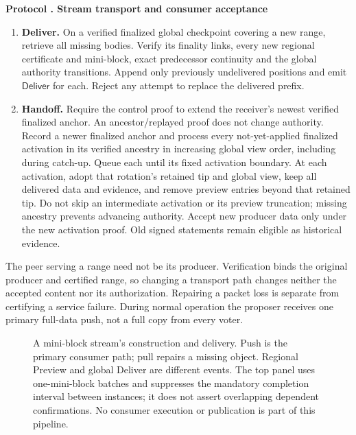 \documentclass[11pt,a4paper,onecolumn]{article}
\newcommand{\RC}{\mathsf{RC}}
\newcommand{\Tag}[1]{\mathsf{#1}}
\newcommand{\Proc}[1]{\textnormal{\textsc{#1}}}
\theoremstyle{remark}\newtheorem{example}[definition]{Example}
\newcounter{protocol}
\newenvironment{protocol}[2]{\refstepcounter{protocol}\label{#1}\begin{mdframed}[nobreak=true,linewidth=.6pt,skipabove=10pt,skipbelow=10pt,innertopmargin=8pt,innerbottommargin=8pt]\small\raggedright\noindent\textbf{Protocol \theprotocol. #2}\par\smallskip}{\end{mdframed}}
\begin{document}
\begin{protocol}{alg:pull}{Stream transport and consumer acceptance}
\begin{enumerate}[label=\textbf{D\arabic*.}]
regional outcome chain with $\Proc{VerifyQC}$ on every $\RC$. Check that the
activation proof authorizes the receiver's current global view and its fixed
activation time has been reached. Append verified positions in order
to the preview suffix and emit $\Tag{Preview}$. Missing predecessors prevent
output. Stop extending an old global view after learning its finalized successor.
\item \textbf{Deliver.} On a verified finalized global checkpoint covering a
new range, retrieve all missing bodies. Verify its finality links, every new
regional certificate and mini-block, exact predecessor continuity and the global
authority transitions. Append only previously undelivered positions and emit
$\Tag{Deliver}$ for each. Reject any attempt to replace the delivered prefix.
\item \textbf{Handoff.} Require the control proof to extend the receiver's
newest verified finalized anchor. An ancestor/replayed proof does not change
authority. Record a newer finalized anchor and process every not-yet-applied
finalized activation in its verified ancestry in increasing global view order,
including during catch-up. Queue each until its fixed activation boundary.
At each activation, adopt that rotation's retained tip and global view, keep all
delivered data and evidence, and remove preview entries beyond that retained tip.
Do not skip an intermediate activation or its preview truncation; missing
ancestry prevents advancing authority. Accept new producer data only under
the new activation proof.
Old signed statements remain eligible as historical evidence.
\end{enumerate}
\end{protocol}

The peer serving a range need not be its producer. Verification binds the
original producer and certified range, so changing a transport path changes
neither the accepted content nor its authorization. Repairing a packet loss
is separate from certifying a service failure. During normal operation the
proposer receives one primary full-data push, not a full copy from every voter.

\begin{figure}[htbp]\centering

\caption{A mini-block stream's construction and delivery. Push is the primary
consumer path; pull repairs a missing object. Regional Preview and global
Deliver are different events. The top panel uses one-mini-block batches and suppresses
the mandatory completion interval between instances; it does not assert
overlapping dependent confirmations. No consumer execution or publication is
part of this pipeline.}
\label{fig:stream}
\end{figure}
\end{document}
